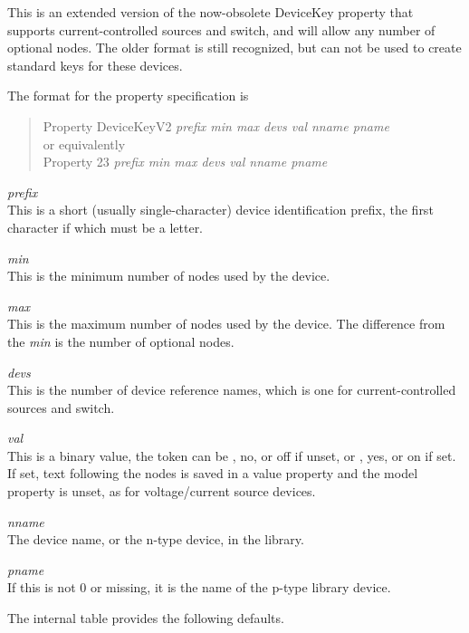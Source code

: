 \begin{description}
This is an extended version of the now-obsolete {\vt DeviceKey}
property that supports current-controlled sources and switch, and will
allow any number of optional nodes.  The older format is still
recognized, but can not be used to create standard keys for these
devices.

The format for the property specification is
\begin{quote}
{\vt Property DeviceKeyV2} {\it prefix min max devs val nname pname}\\
or equivalently\\
{\vt Property 23} {\it prefix min max devs val nname pname}
\end{quote}

\begin{description}
\item{\it prefix}\\
This is a short (usually single-character) device identification prefix,
the first character if which must be a letter.
\item{\it min}\\
This is the minimum number of nodes used by the device.
\item{\it max}\\
This is the maximum number of nodes used by the device.  The
difference from the {\it min} is the number of optional nodes.
\item{\it devs}\\
This is the number of device reference names, which is one for
current-controlled sources and switch.
\item{\it val}\\
This is a binary value, the token can be {}, {\vt no}, or {\vt
off} if unset, or {}, {\vt yes}, or {\vt on} if set.  If set,
text following the nodes is saved in a {\cb value} property and the
{\cb model} property is unset, as for voltage/current source devices.
\item{\it nname}\\
The device name, or the n-type device, in the library.
\item{\it pname}\\
If this is not 0 or missing, it is the name of the p-type library
device.
\end{description}

The internal table provides the following defaults.


\end{description}
